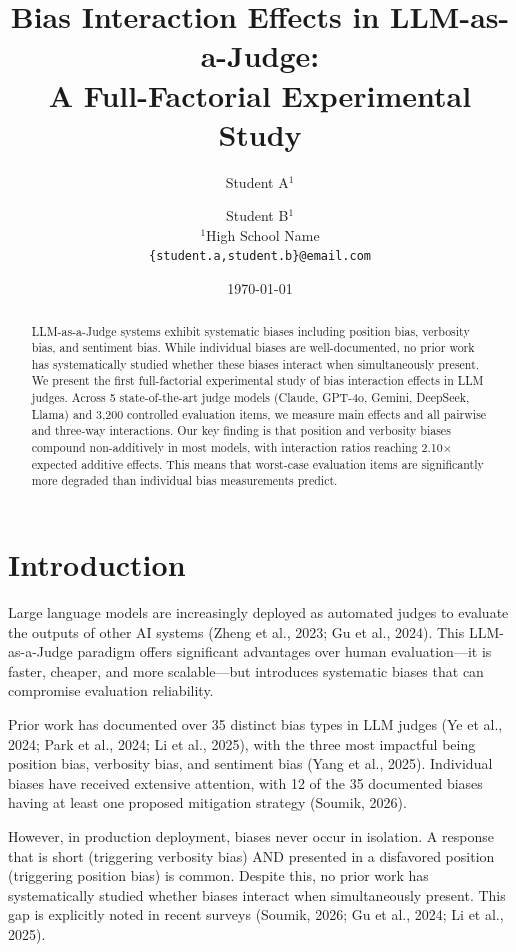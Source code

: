 \documentclass[11pt,twocolumn]{article}
\title{Bias Interaction Effects in LLM-as-a-Judge:\\A Full-Factorial Experimental Study}
\author{Student A$^{1}$ \and Student B$^{1}$ \\
$^{1}$High School Name \\
\texttt{\{student.a,student.b\}@email.com}
}
\date{\today}
\begin{document}
\maketitle

\begin{abstract}
LLM-as-a-Judge systems exhibit systematic biases including position bias, verbosity bias, and sentiment bias. While individual biases are well-documented, no prior work has systematically studied whether these biases interact when simultaneously present. We present the first full-factorial experimental study of bias interaction effects in LLM judges. Across 5 state-of-the-art judge models (Claude, GPT-4o, Gemini, DeepSeek, Llama) and 3,200 controlled evaluation items, we measure main effects and all pairwise and three-way interactions. Our key finding is that position and verbosity biases compound non-additively in most models, with interaction ratios reaching 2.10$\times$ expected additive effects. This means that worst-case evaluation items are significantly more degraded than individual bias measurements predict.
\end{abstract}

\section{Introduction}

Large language models are increasingly deployed as automated judges to evaluate the outputs of other AI systems (Zheng et al., 2023; Gu et al., 2024). This LLM-as-a-Judge paradigm offers significant advantages over human evaluation---it is faster, cheaper, and more scalable---but introduces systematic biases that can compromise evaluation reliability.

Prior work has documented over 35 distinct bias types in LLM judges (Ye et al., 2024; Park et al., 2024; Li et al., 2025), with the three most impactful being position bias, verbosity bias, and sentiment bias (Yang et al., 2025). Individual biases have received extensive attention, with 12 of the 35 documented biases having at least one proposed mitigation strategy (Soumik, 2026).

However, in production deployment, biases never occur in isolation. A response that is short (triggering verbosity bias) AND presented in a disfavored position (triggering position bias) is common. Despite this, no prior work has systematically studied whether biases interact when simultaneously present. This gap is explicitly noted in recent surveys (Soumik, 2026; Gu et al., 2024; Li et al., 2025).
\end{document}
